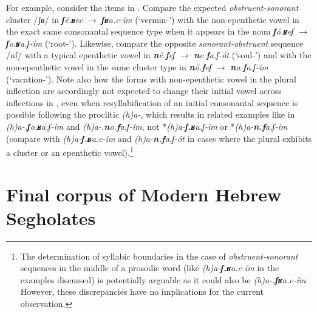 For example, consider the items in . Compare the expected \emph{obstruent-sonorant} cluster /ʃʁ/ in \emph{\textbf{ʃ}é.\textbf{ʁ}ec} \(\to\) \emph{\textbf{ʃʁ}a.c-ím} (`vermin-\Pl{}') with the non-epenthetic vowel in the exact same consonantal sequence type when it appears in the noun \emph{\textbf{ʃ}ó.\textbf{ʁ}eʃ} \(\to\) \emph{\textbf{ʃ}o.\textbf{ʁ}a.ʃ-ím} (`root-\Pl{}'). Likewise, compare the opposite \emph{sonorant-obstruent} sequence /nf/ with a typical epenthetic vowel in \emph{\textbf{n}é.\textbf{f}eʃ} \(\to\) \emph{\textbf{n}e.\textbf{f}a.ʃ-ót} (`soul-\Pl{}') and with the non-epenthetic vowel in the same cluster type in \emph{\textbf{n}ó.\textbf{f}eʃ} \(\to\) \emph{\textbf{n}o.\textbf{f}a.ʃ-ím} (`vacation-\Pl{}'). Note also how the forms with non-epenthetic vowel in the plural inflection are accordingly not expected to change their initial vowel across inflections in , even when resyllabification of an initial consonantal sequence is possible following the proclitic \emph{(h)a-}, which results in related examples like in \emph{(h)a-.\textbf{ʃ}o.\textbf{ʁ}a.ʃ-ím} and \emph{(h)a-.\textbf{n}o.\textbf{f}a.ʃ-ím}, not *\emph{(h)a-\textbf{ʃ.ʁ}a.ʃ-ím} or *\emph{(h)a-\textbf{n.f}a.ʃ-ím} (compare with \emph{(h)a-\textbf{ʃ.ʁ}a.c-ím} and \emph{(h)a-\textbf{n.f}a.ʃ-ót} in cases where the plural exhibits a cluster or an epenthetic vowel).\footnote{The determination of syllabic boundaries in the case of \emph{obstruent-sonorant} sequences in the middle of a prosodic word (like \emph{(h)a-\textbf{ʃ.ʁ}a.c-ím} in the examples discussed) is potentially arguable as it could also be \emph{(h)a-\textbf{.ʃʁ}a.c-ím}. However, these discrepancies have no implications for the current observation.}

\section{Final corpus of Modern Hebrew Segholates}\label{sec:diachronicstudyset}\largerpage


